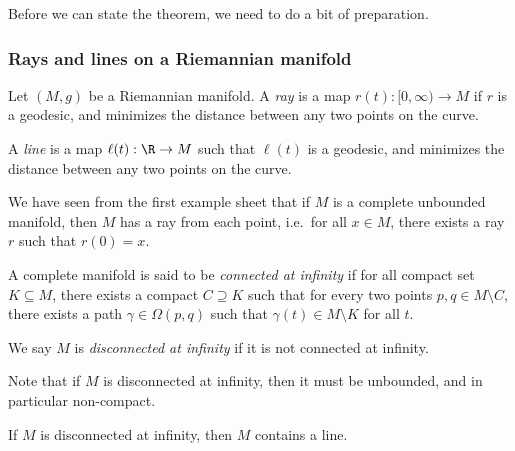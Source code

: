 \documentclass[a4paper]{article}
\begin{document}
Before we can state the theorem, we need to do a bit of preparation.
\subsubsection*{Rays and lines on a Riemannian manifold}

\begin{defi}[Ray]
  Let $(M, g)$ be a Riemannian manifold. A \emph{ray} is a map $r(t): [0, \infty) \to M$ if $r$ is a geodesic, and minimizes the distance between any two points on the curve.
\end{defi}

\begin{defi}[Line]
  A \emph{line} is a map $\ell(t): \R \to M$ such that $\ell(t)$ is a geodesic, and minimizes the distance between any two points on the curve.
\end{defi}

We have seen from the first example sheet that if $M$ is a complete unbounded manifold, then $M$ has a ray from each point, i.e.\ for all $x \in M$, there exists a ray $r$ such that $r(0) = x$.

\begin{defi}
  A complete manifold is said to be \emph{connected at infinity} if for all compact set $K \subseteq M$, there exists a compact $C \supseteq K$ such that for every two points $p, q \in M \setminus C$, there exists a path $\gamma \in \Omega(p, q)$ such that $\gamma(t) \in M \setminus K$ for all $t$.

  We say $M$ is \emph{disconnected at infinity} if it is not connected at infinity.
\end{defi}

Note that if $M$ is disconnected at infinity, then it must be unbounded, and in particular non-compact.

\begin{lemma}
  If $M$ is disconnected at infinity, then $M$ contains a line.
\end{lemma}
\end{document}
